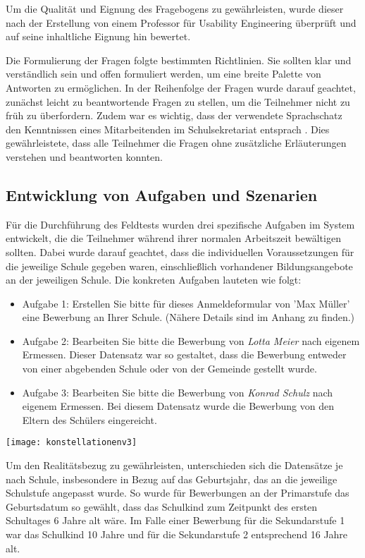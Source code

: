 Um die Qualität und Eignung des Fragebogens zu gewährleisten, wurde dieser nach der Erstellung von einem Professor für Usability Engineering überprüft und auf seine inhaltliche Eignung hin bewertet.

Die Formulierung der Fragen folgte bestimmten Richtlinien. Sie sollten klar und verständlich sein und offen formuliert werden, um eine breite Palette von Antworten zu ermöglichen. In der Reihenfolge der Fragen wurde darauf geachtet, zunächst leicht zu beantwortende Fragen zu stellen, um die Teilnehmer nicht zu früh zu überfordern. Zudem war es wichtig, dass der verwendete Sprachschatz den Kenntnissen eines Mitarbeitenden im Schulsekretariat entsprach \cite{Kruse_2015}. Dies gewährleistete, dass alle Teilnehmer die Fragen ohne zusätzliche Erläuterungen verstehen und beantworten konnten.

\subsection{Entwicklung von Aufgaben und Szenarien}

Für die Durchführung des Feldtests wurden drei spezifische Aufgaben im System entwickelt, die die Teilnehmer während ihrer normalen Arbeitszeit bewältigen sollten. Dabei wurde darauf geachtet, dass die individuellen  Voraussetzungen für die jeweilige Schule gegeben waren, einschließlich  vorhandener Bildungsangebote an der jeweiligen Schule. Die konkreten Aufgaben lauteten wie folgt:

\begin{itemize}
\item Aufgabe 1: \glqq Erstellen Sie bitte für dieses Anmeldeformular von 'Max Müller' eine Bewerbung an Ihrer Schule.\grqq{}  (Nähere Details sind im Anhang zu finden.)
\item Aufgabe 2: \glqq Bearbeiten Sie bitte die Bewerbung von \textit{Lotta Meier} nach eigenem Ermessen.\grqq{}  Dieser Datensatz war so gestaltet, dass die Bewerbung entweder von einer abgebenden Schule oder von der Gemeinde gestellt wurde.
\item Aufgabe 3: \glqq Bearbeiten Sie bitte die Bewerbung von \textit{Konrad Schulz} nach eigenem Ermessen.\grqq{}  Bei diesem Datensatz wurde die Bewerbung von den Eltern des Schülers eingereicht.
\end{itemize}

\texttt{[image: konstellationenv3]}


Um den Realitätsbezug zu gewährleisten, unterschieden sich die Datensätze je nach Schule, insbesondere in Bezug auf das Geburtsjahr, das an die jeweilige Schulstufe angepasst wurde. So wurde für Bewerbungen an der Primarstufe das Geburtsdatum so gewählt, dass das Schulkind zum Zeitpunkt des ersten Schultages 6 Jahre alt wäre. Im Falle einer Bewerbung für die Sekundarstufe 1 war das Schulkind 10 Jahre und für die Sekundarstufe 2 entsprechend 16 Jahre alt.


